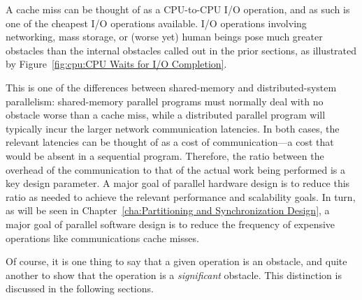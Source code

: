 A cache miss can be thought of as a CPU-to-CPU I/O operation, and as
such is one of the cheapest I/O operations available.
I/O operations involving networking, mass storage, or (worse yet) human
beings pose much greater obstacles than the internal obstacles called
out in the prior sections,
as illustrated by
Figure~\ref{fig:cpu:CPU Waits for I/O Completion}.

This is one of the differences between shared-memory and distributed-system
parallelism: shared-memory parallel programs must normally deal with no
obstacle worse than a cache miss, while a distributed parallel program
will typically incur the larger network communication latencies.
In both cases, the relevant latencies can be thought of as a cost of
communication---a cost that would be absent in a sequential program.
Therefore, the ratio between the overhead of the communication to
that of the actual work being performed is a key design parameter.
A major goal of parallel hardware design is to reduce this ratio as
needed to achieve the relevant performance and scalability goals.
In turn, as will be seen in
Chapter~\ref{cha:Partitioning and Synchronization Design},
a major goal of parallel software design is to reduce the
frequency of expensive operations like communications cache misses.

Of course, it is one thing to say that a given operation is an obstacle,
and quite another to show that the operation is a \emph{significant}
obstacle.
This distinction is discussed in the following sections.
